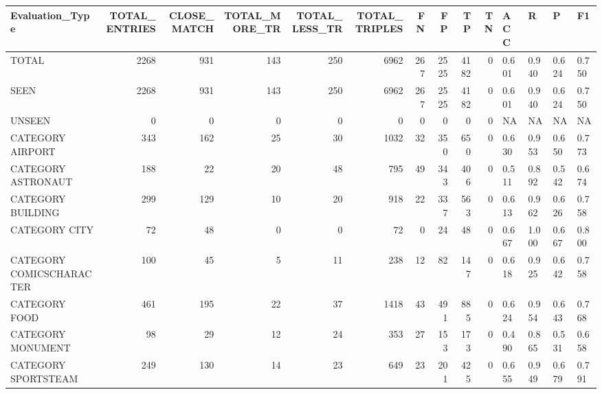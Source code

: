 \begin{tabular}{lrrrrrrrrrllll}
\hline
 Evaluation\_Type          &   TOTAL\_ENTRIES &   CLOSE\_MATCH &   TOTAL\_MORE\_TR &   TOTAL\_LESS\_TR &   TOTAL\_TRIPLES &   FN &   FP &   TP &   TN & ACC   & R     & P     & F1    \\
\hline
 TOTAL                    &            2268 &           931 &             143 &             250 &            6962 &  267 & 2525 & 4182 &    0 & 0.601 & 0.940 & 0.624 & 0.750 \\
 SEEN                     &            2268 &           931 &             143 &             250 &            6962 &  267 & 2525 & 4182 &    0 & 0.601 & 0.940 & 0.624 & 0.750 \\
 UNSEEN                   &               0 &             0 &               0 &               0 &               0 &    0 &    0 &    0 &    0 & NA    & NA    & NA    & NA    \\
 CATEGORY AIRPORT         &             343 &           162 &              25 &              30 &            1032 &   32 &  350 &  650 &    0 & 0.630 & 0.953 & 0.650 & 0.773 \\
 CATEGORY ASTRONAUT       &             188 &            22 &              20 &              48 &             795 &   49 &  343 &  406 &    0 & 0.511 & 0.892 & 0.542 & 0.674 \\
 CATEGORY BUILDING        &             299 &           129 &              10 &              20 &             918 &   22 &  337 &  563 &    0 & 0.613 & 0.962 & 0.626 & 0.758 \\
 CATEGORY CITY            &              72 &            48 &               0 &               0 &              72 &    0 &   24 &   48 &    0 & 0.667 & 1.000 & 0.667 & 0.800 \\
 CATEGORY COMICSCHARACTER &             100 &            45 &               5 &              11 &             238 &   12 &   82 &  147 &    0 & 0.618 & 0.925 & 0.642 & 0.758 \\
 CATEGORY FOOD            &             461 &           195 &              22 &              37 &            1418 &   43 &  491 &  885 &    0 & 0.624 & 0.954 & 0.643 & 0.768 \\
 CATEGORY MONUMENT        &              98 &            29 &              12 &              24 &             353 &   27 &  153 &  173 &    0 & 0.490 & 0.865 & 0.531 & 0.658 \\
 CATEGORY SPORTSTEAM      &             249 &           130 &              14 &              23 &             649 &   23 &  201 &  425 &    0 & 0.655 & 0.949 & 0.679 & 0.791 \\

\end{tabular}
